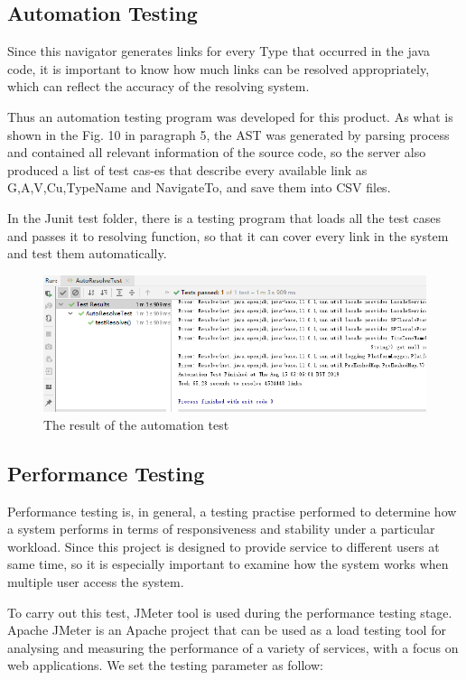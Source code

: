 \documentclass[runningheads]{llncs}
\begin{document}
\subsection{Automation Testing}
Since this navigator generates links for every Type that occurred in the java code, it is important to know how much links can be resolved appropriately, which can reflect the accuracy of the resolving system.

Thus an automation testing program was developed for this product. As what is shown in the Fig. 10 in paragraph 5, the AST was generated by parsing process and contained all relevant information of the source code, so the server also produced a list of test cas-es that describe every available link as G,A,V,Cu,TypeName and NavigateTo, and save them into CSV files.

In the Junit test folder, there is a testing program that loads all the test cases and passes it to resolving function, so that it can cover every link in the system and test them automatically.


\begin{figure}[H]
	\centering
	\includegraphics[width=12cm]{pic/automation-test.png}
	\caption{The result of the automation test}
	\label{The result of the automation test}
\end{figure}

\subsection{Performance Testing}
Performance testing is, in general, a testing practise performed to determine how a system performs in terms of responsiveness and stability under a particular workload.\cite{performance_testing} Since this project is designed to provide service to different users at same time, so it is especially important to examine how the system works when multiple user access the system.

To carry out this test, JMeter\cite{halili2008jemeter} tool is used during the performance testing stage. Apache JMeter is an Apache project that can be used as a load testing tool for analysing and measuring the performance of a variety of services, with a focus on web applications.\cite{Apache_JMeter} We set the testing parameter as follow:
\end{document}
